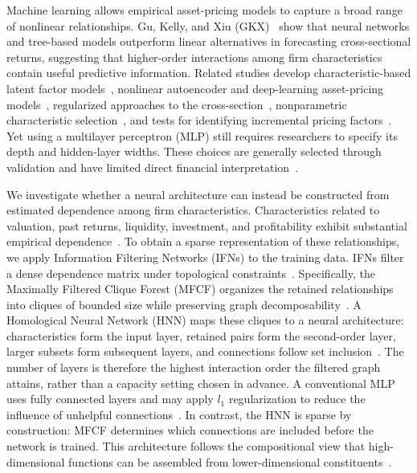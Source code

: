 \documentclass[sigconf,nonacm]{acmart}
\begin{document}
Machine learning allows empirical asset-pricing models to capture a broad range of nonlinear relationships. Gu, Kelly, and Xiu (GKX)~\cite{gu2020} show that neural networks and tree-based models outperform linear alternatives in forecasting cross-sectional returns, suggesting that higher-order interactions among firm characteristics contain useful predictive information. Related studies develop characteristic-based latent factor models~\cite{kelly2019}, nonlinear autoencoder and deep-learning asset-pricing models~\cite{gu2021autoencoder,chen2024}, regularized approaches to the cross-section~\cite{kozak2020}, nonparametric characteristic selection~\cite{freyberger2020}, and tests for identifying incremental pricing
factors~\cite{feng2020}.
Yet using a multilayer perceptron (MLP) still requires researchers to specify
its depth and hidden-layer widths. These choices are generally selected through
validation and have limited direct financial interpretation~\cite{elsken2019}.

We investigate whether a neural architecture can instead be constructed from estimated dependence among firm characteristics. Characteristics related to valuation, past returns, liquidity, investment, and profitability exhibit substantial empirical dependence~\cite{kozak2020,feng2020}. To obtain a sparse representation of these relationships, we apply Information Filtering Networks (IFNs) to the training data. IFNs filter a dense dependence matrix under topological constraints~\cite{mantegna1999,tumminello2005,massara2017}. Specifically, the Maximally Filtered Clique Forest (MFCF) organizes the retained relationships into cliques of bounded size while preserving graph decomposability~\cite{massara2019}. A Homological Neural Network (HNN) maps these cliques to a neural architecture: characteristics form the input layer, retained pairs form the second-order layer, larger subsets form subsequent layers, and connections follow set inclusion~\cite{wang2023hnn,lin2026}. The number of layers is therefore the highest interaction order the filtered graph attains, rather than a capacity setting chosen in advance. A conventional MLP uses fully connected layers and may apply \(l_1\) regularization to reduce the influence of unhelpful connections~\cite{tibshirani1996,gu2020}. In contrast, the HNN is sparse by construction: MFCF determines which connections are included before the network is trained. This architecture follows the compositional view that high-dimensional functions can be assembled from lower-dimensional constituents~\cite{poggio2017}.
\end{document}
